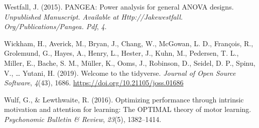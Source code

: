 \documentclass[
  doc, donotrepeattitle,floatsintext]{apa7}
\newlength{\cslhangindent}
\newlength{\cslentryspacingunit} %
\newenvironment{CSLReferences}[2] %
 {%
  \setlength{\parindent}{0pt}
  \ifodd #1
  \let\oldpar\par
  \def\par{\hangindent=\cslhangindent\oldpar}
  \fi
  \setlength{\parskip}{#2\cslentryspacingunit}
 }%
 {}
\begin{document}
\begin{CSLReferences}{1}{0}
\leavevmode{}%
Westfall, J. (2015). PANGEA: Power analysis for general ANOVA designs. \emph{Unpublished Manuscript. Available at Http://Jakewestfall. Org/Publications/Pangea. Pdf}, \emph{4}.

\leavevmode{}%
Wickham, H., Averick, M., Bryan, J., Chang, W., McGowan, L. D., François, R., Grolemund, G., Hayes, A., Henry, L., Hester, J., Kuhn, M., Pedersen, T. L., Miller, E., Bache, S. M., Müller, K., Ooms, J., Robinson, D., Seidel, D. P., Spinu, V., \ldots{} Yutani, H. (2019). Welcome to the {tidyverse}. \emph{Journal of Open Source Software}, \emph{4}(43), 1686. \url{https://doi.org/10.21105/joss.01686}

\leavevmode{}%
Wulf, G., \& Lewthwaite, R. (2016). Optimizing performance through intrinsic motivation and attention for learning: The OPTIMAL theory of motor learning. \emph{Psychonomic Bulletin \& Review}, \emph{23}(5), 1382--1414.

\end{CSLReferences}
\end{document}
